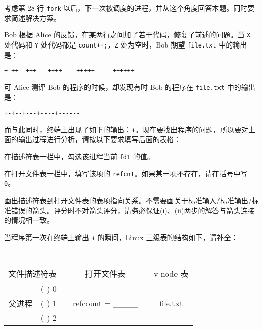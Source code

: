 \begin{problems}
        \begin{hint}
            考虑第 28 行 \verb|fork| 以后，下一次被调度的进程，并从这个角度回答本题。同时要求简述解决方案。
        \end{hint}
        \qn Bob 根据 Alice 的反馈，在某两行之间加了若干代码，修复了前述的问题。当 \verb|X| 处代码和 \verb|Y| 处代码都是 \verb|count++;|，\verb|Z| 处为空时，Bob 期望 \verb|file.txt| 中的输出是：
        \begin{center}
            \verb|+-++--+++---++++----+++++-----++++++------|
        \end{center}
        可 Alice 测评 Bob 的程序的时候，却发现有时 Bob 的程序在 \verb|file.txt| 中的输出是：
        \begin{center}
            \verb|+-+--+---+----+------|
        \end{center}
        而与此同时，终端上出现了如下的输出：\verb|+|。现在要找出程序的问题，所以要对上面的输出过程进行分析，请按以下要求填写后面的表格：
        \begin{compactenum}[(i)]
            \item 在描述符表一栏中，勾选该进程当前 \verb|fd1| 的值。
            \item 在打开文件表一栏中，填写该项的 \verb|refcnt|。如果某一项不存在，请在括号中写 \verb|0|。
            \item 画出描述符表到打开文件表的表项指向关系。不需要画关于标准输入/标准输出/标准错误的箭头。评分时不对箭头评分，请务必保证(i)、(ii)两步的解答与箭头连接的情况相一致。
        \end{compactenum}
        \subqn 当程序第一次在终端上输出 \verb|+| 的瞬间，Linux 三级表的结构如下，请补全：
        \begin{table}[H]
            \tt
            \centering
            \begin{tabular}{cccccc}
                \multicolumn{2}{c}{文件描述符表} & {\qquad} & 打开文件表 & {\qquad} & v-node 表 \\ \cline{1-2} \cline{4-4} \cline{6-6} 
                \multicolumn{1}{|c|}{\multirow{4}{*}{父进程}} & \multicolumn{1}{c|}{(     ) 0} & \multicolumn{1}{c|}{} & \multicolumn{1}{c|}{\multirow{4}{*}{refcount = \_\_\_\_}} & \multicolumn{1}{c|}{} & \multicolumn{1}{c|}{\multirow{9}{*}{file.txt}} \\ \cline{2-2}
                \multicolumn{1}{|c|}{} & \multicolumn{1}{c|}{(     ) 1} & \multicolumn{1}{c|}{} & \multicolumn{1}{c|}{} & \multicolumn{1}{c|}{} & \multicolumn{1}{c|}{} \\ \cline{2-2}
                \multicolumn{1}{|c|}{} & \multicolumn{1}{c|}{(     ) 2} & \multicolumn{1}{c|}{} & \multicolumn{1}{c|}{} & \multicolumn{1}{c|}{} & \multicolumn{1}{c|}{} \\ \cline{2-2}

\end{tabular}
\end{table}
\end{problems}
